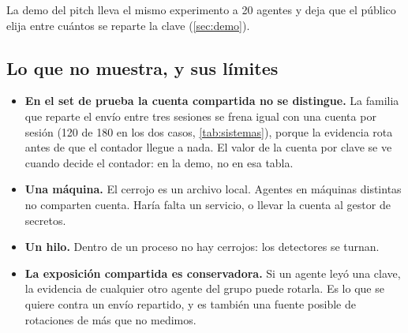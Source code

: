 La demo del pitch lleva el mismo experimento a 20 agentes y deja que el público elija entre cuántos se
reparte la clave (\cref{sec:demo}).

\subsection{Lo que no muestra, y sus límites}

\begin{itemize}
  \item \textbf{En el set de prueba la cuenta compartida no se distingue.} La familia que reparte el
    envío entre tres sesiones se frena igual con una cuenta por sesión (120 de 180 en los dos casos,
    \cref{tab:sistemas}), porque la evidencia rota antes de que el contador llegue a nada. El valor
    de la cuenta por clave se ve cuando decide el contador: en la demo, no en esa tabla.
  \item \textbf{Una máquina.} El cerrojo es un archivo local. Agentes en máquinas distintas no
    comparten cuenta. Haría falta un servicio, o llevar la cuenta al gestor de secretos.
  \item \textbf{Un hilo.} Dentro de un proceso no hay cerrojos: los detectores se turnan.
  \item \textbf{La exposición compartida es conservadora.} Si un agente leyó una clave, la evidencia de
    cualquier otro agente del grupo puede rotarla. Es lo que se quiere contra un envío repartido, y es
    también una fuente posible de rotaciones de más que no medimos.
\end{itemize}

